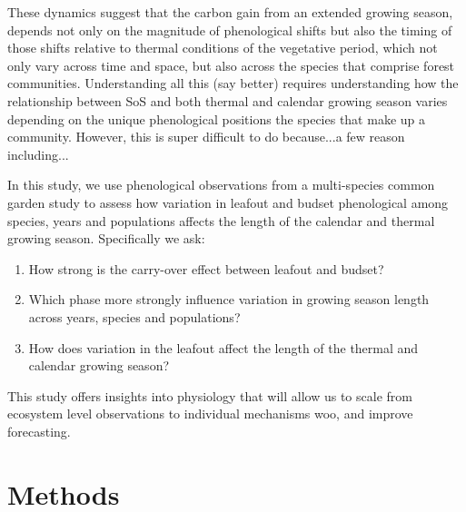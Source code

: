 \documentclass[12 pt]{article}
\begin{document}
These dynamics suggest that the carbon gain from an extended growing season, depends not only on the magnitude of phenological shifts but also the timing of those shifts relative to thermal conditions of the vegetative period, which not only vary across time and space, but also across the species that comprise forest communities. Understanding all this (say better) requires  understanding how the relationship between SoS and both thermal and calendar growing season varies depending on the unique phenological positions the species that make up a community. However, this is super difficult to do because...a few reason including...  

In this study, we use phenological observations from a multi-species common garden study to 
assess how variation in leafout and  budset phenological among species, years and populations affects the length of the calendar and thermal growing season. Specifically we ask:

\begin{enumerate} %
\item How strong is the carry-over effect between leafout and budset? 
\item Which phase more strongly influence variation in growing season length across years, species and populations?
\item How does variation in the leafout affect the length of the thermal and calendar growing season?
\end{enumerate}

This study offers insights into physiology that will allow us to scale from ecosystem level observations to individual mechanisms woo, and improve forecasting. %

\section{Methods}
\end{document}
